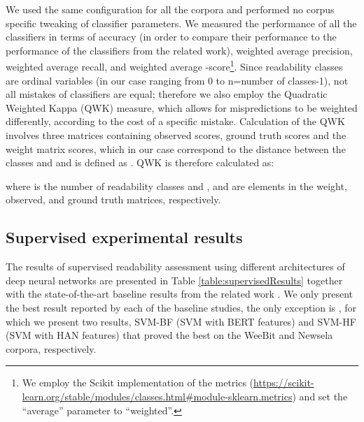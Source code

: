 \documentclass{clv3}
\begin{document}
We used the same configuration for all the corpora and performed no corpus specific tweaking of classifier parameters. We measured the performance of all the classifiers in terms of accuracy (in order to compare their performance to the performance of the classifiers from the related work), weighted average precision, weighted average recall, and weighted average -score\footnote{We employ the Scikit implementation of the metrics (\url{https://scikit-learn.org/stable/modules/classes.html\#module-sklearn.metrics}) and set the ``average'' parameter to ``weighted''.}. Since readability classes are ordinal variables (in our case ranging from 0 to n=number of classes-1), not all mistakes of classifiers are equal; therefore we also employ the Quadratic Weighted Kappa (QWK) measure, which allows for mispredictions to be weighted differently, according to the cost of a specific mistake. Calculation of the QWK involves three matrices containing observed scores, ground truth scores and the weight matrix scores, which in our case correspond to the distance  between the classes  and  and is defined as . QWK is therefore calculated as:


\noindent 

\noindent where  is the number of readability classes and ,  and  are elements in the weight, observed, and ground truth matrices, respectively.

\subsection{Supervised experimental results}
\label{sec-results-supervised}

The results of supervised readability assessment using different architectures of deep neural networks are presented in Table \ref{table:supervisedResults} together with the state-of-the-art baseline results from the related work \citep{filighera2019automatic, xia2016text, deutsch2020linguistic}. We only present the best result reported by each of the baseline studies, the only exception is \citet{deutsch2020linguistic}, for which we present two results, SVM-BF (SVM with BERT features) and SVM-HF (SVM with HAN features) that proved the best on the WeeBit and Newsela corpora, respectively.
\end{document}
